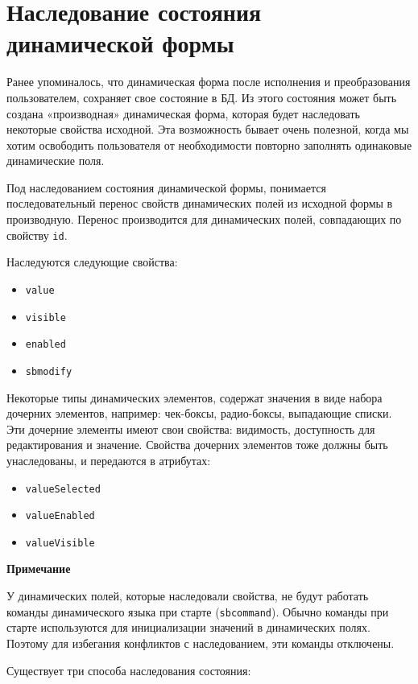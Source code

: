 \documentclass[../index.tex]{subfiles}
\begin{document}
\section{Наследование состояния\\динамической формы}
Ранее упоминалось, что динамическая форма после исполнения и преобразования пользователем,
сохраняет свое состояние в БД. Из этого состояния может быть создана «производная» динамическая форма,
которая будет наследовать некоторые свойства исходной. Эта возможность бывает очень полезной,
когда мы хотим освободить пользователя от необходимости повторно заполнять одинаковые динамические поля.

Под наследованием состояния динамической формы, понимается последовательный перенос свойств динамических полей
из исходной формы в производную. Перенос производится для динамических полей, совпадающих по свойству \verb|id|.


Наследуются следующие свойства:
\begin{itemize}
    \item \verb|value|
    \item \verb|visible|
    \item \verb|enabled|
    \item \verb|sbmodify|
\end{itemize}
\vspace{5mm}


Некоторые типы динамических элементов, содержат значения в виде набора дочерних элементов,
например: чек-боксы, радио-боксы, выпадающие списки. Эти дочерние элементы имеют свои
свойства: видимость, доступность для редактирования и значение.
Свойства дочерних элементов тоже должны быть унаследованы, и передаются в
атрибутах:
\begin{itemize}
  \item \verb|valueSelected|
  \item \verb|valueEnabled|
  \item \verb|valueVisible|
\end{itemize}
\vspace{5mm}


\textbf{Примечание}


У динамических полей, которые наследовали свойства,
не будут работать команды динамического языка при старте (\verb|sbcommand|).
Обычно команды при старте используются для инициализации значений в динамических полях.
Поэтому для избегания конфликтов с наследованием, эти команды отключены.


Существует три способа наследования состояния:
\end{document}
